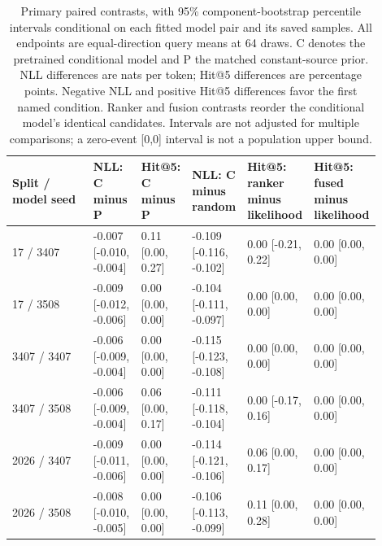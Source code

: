 \begin{table}[ht]
\centering
\caption{Primary paired contrasts, with 95\% component-bootstrap percentile intervals conditional on each fitted model pair and its saved samples. All endpoints are equal-direction query means at 64 draws. C denotes the pretrained conditional model and P the matched constant-source prior. NLL differences are nats per token; Hit@5 differences are percentage points. Negative NLL and positive Hit@5 differences favor the first named condition. Ranker and fusion contrasts reorder the conditional model's identical candidates. Intervals are not adjusted for multiple comparisons; a zero-event [0,0] interval is not a population upper bound.}
\label{tab:paired}
\small
\setlength{\tabcolsep}{3pt}
\begin{tabular}{p{0.2200\linewidth}p{0.1360\linewidth}p{0.1360\linewidth}p{0.1360\linewidth}p{0.1360\linewidth}p{0.1360\linewidth}}
\toprule
Split / model seed & NLL: C minus P & Hit@5: C minus P & NLL: C minus random & Hit@5: ranker minus likelihood & Hit@5: fused minus likelihood\\
\midrule
17 / 3407 & -0.007 [-0.010, -0.004] & 0.11 [0.00, 0.27] & -0.109 [-0.116, -0.102] & 0.00 [-0.21, 0.22] & 0.00 [0.00, 0.00]\\
17 / 3508 & -0.009 [-0.012, -0.006] & 0.00 [0.00, 0.00] & -0.104 [-0.111, -0.097] & 0.00 [0.00, 0.00] & 0.00 [0.00, 0.00]\\
3407 / 3407 & -0.006 [-0.009, -0.004] & 0.00 [0.00, 0.00] & -0.115 [-0.123, -0.108] & 0.00 [0.00, 0.00] & 0.00 [0.00, 0.00]\\
3407 / 3508 & -0.006 [-0.009, -0.004] & 0.06 [0.00, 0.17] & -0.111 [-0.118, -0.104] & 0.00 [-0.17, 0.16] & 0.00 [0.00, 0.00]\\
2026 / 3407 & -0.009 [-0.011, -0.006] & 0.00 [0.00, 0.00] & -0.114 [-0.121, -0.106] & 0.06 [0.00, 0.17] & 0.00 [0.00, 0.00]\\
2026 / 3508 & -0.008 [-0.010, -0.005] & 0.00 [0.00, 0.00] & -0.106 [-0.113, -0.099] & 0.11 [0.00, 0.28] & 0.00 [0.00, 0.00]\\
\bottomrule
\end{tabular}
\end{table}
